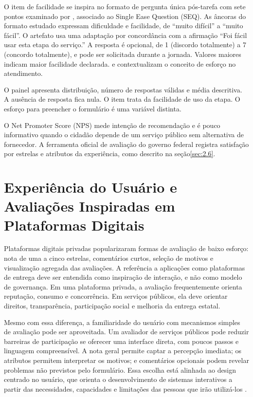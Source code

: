 O item de facilidade se inspira no formato de pergunta única pós-tarefa com sete pontos examinado por , associado ao Single Ease Question (SEQ). As âncoras do formato estudado expressam dificuldade e facilidade, de ``muito difícil'' a ``muito fácil''. O artefato usa uma adaptação por concordância com a afirmação ``Foi fácil usar esta etapa do serviço.'' A resposta é opcional, de 1 (discordo totalmente) a 7 (concordo totalmente), e pode ser solicitada durante a jornada. Valores maiores indicam maior facilidade declarada.  e  contextualizam o conceito de esforço no atendimento.

O painel apresenta distribuição, número de respostas válidas e média descritiva. A ausência de resposta fica nula. O item trata da facilidade de uso da etapa. O esforço para preencher o formulário é uma variável distinta.

O Net Promoter Score (NPS) mede intenção de recomendação e é pouco informativo quando o cidadão depende de um serviço público sem alternativa de fornecedor. A ferramenta oficial de avaliação do governo federal registra satisfação por estrelas e atributos da experiência, como descrito na seção\nobreakspace{}\ref{sec:2.6}.

\section{Experiência do Usuário e Avaliações Inspiradas em Plataformas Digitais}
\label{sec:2.8}

Plataformas digitais privadas popularizaram formas de avaliação de baixo esforço: nota de uma a cinco estrelas, comentários curtos, seleção de motivos e visualização agregada das avaliações. A referência a aplicações como plataformas de entrega deve ser entendida como inspiração de interação, e não como modelo de governança. Em uma plataforma privada, a avaliação frequentemente orienta reputação, consumo e concorrência. Em serviços públicos, ela deve orientar direitos, transparência, participação social e melhoria da entrega estatal.

Mesmo com essa diferença, a familiaridade do usuário com mecanismos simples de avaliação pode ser aproveitada. Um avaliador de serviços públicos pode reduzir barreiras de participação se oferecer uma interface direta, com poucos passos e linguagem compreensível. A nota geral permite captar a percepção imediata; os atributos permitem interpretar os motivos; e comentários opcionais podem revelar problemas não previstos pelo formulário. Essa escolha está alinhada ao design centrado no usuário, que orienta o desenvolvimento de sistemas interativos a partir das necessidades, capacidades e limitações das pessoas que irão utilizá-los \cite{iso2019}.

